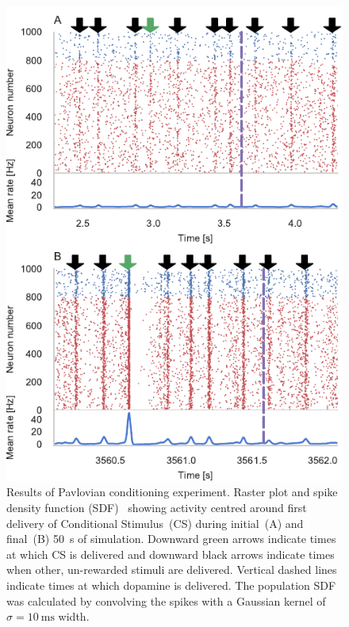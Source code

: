 \documentclass[utf8]{frontiersSCNS} %
\begin{document}
\begin{figure}[t!]
    \begin{center}
        \includegraphics{figures/izhikevich_spikes.pdf}
    \end{center}
    \caption{Results of Pavlovian conditioning experiment.
             Raster plot and spike density function (SDF)~\citep{Szucs1998a} showing activity centred around first delivery of Conditional Stimulus~(CS) during initial~(A) and final~(B) \SI{50}{\second} of simulation.
             Downward green arrows indicate times at which CS is delivered and downward black arrows indicate times when other, un-rewarded stimuli are delivered. 
             Vertical dashed lines indicate times at which dopamine is delivered.
             The population SDF was calculated by convolving the spikes with a Gaussian kernel of $\sigma=\SI{10}{\milli\second}$ width.}
    \label{fig:izhikevich_spikes}
\end{figure}
%
\end{document}
